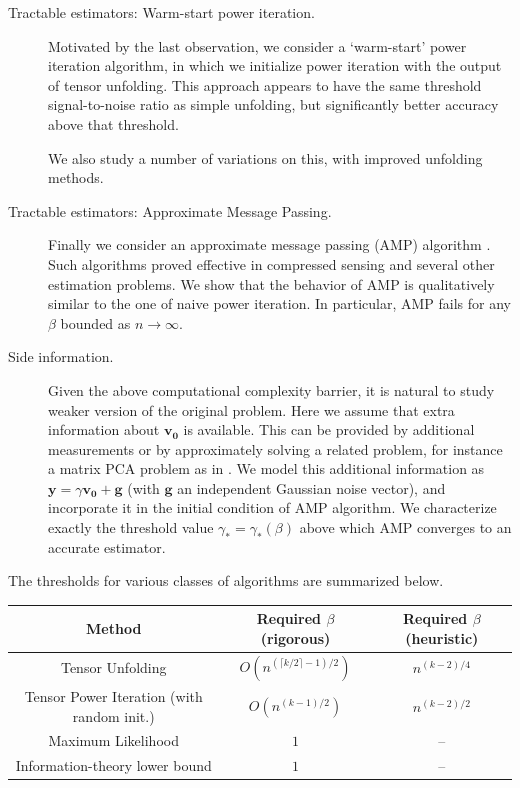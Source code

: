 \documentclass[11pt]{article}
\theoremstyle{definition}
\def\bg{\mathbf{g}}
\def\bvz{\mathbf{v_0}}
\def\by{{\mathbf y}}
\begin{document}
\begin{description}
\item[Tractable estimators: Warm-start power iteration.]
 Motivated by the last observation, we consider a `warm-start'
power iteration algorithm, in which we initialize power iteration with
the output of tensor unfolding. 
This  approach appears to have the same  threshold signal-to-noise
ratio as simple unfolding, but significantly better accuracy above
that threshold.

We also study a number of variations on this, with improved unfolding methods.

\item[Tractable estimators: Approximate Message Passing.] Finally we
consider an approximate message passing (AMP) algorithm \cite{DMM09,BM-MPCS-2011}. Such
algorithms proved effective in compressed sensing and several other
estimation problems. We show that the behavior of AMP is
qualitatively similar to the one of naive power iteration.
In particular,  AMP fails for any $\beta$ bounded as
$n\to\infty$.
%
\item[Side information.] Given the above computational complexity barrier, it is natural to
  study weaker version of the original problem. Here we assume that
  extra information about $\bvz$ is available. This can be provided by
  additional measurements or by approximately solving a related
  problem, for instance a matrix PCA problem as in
  \cite{anandkumar12}. We model this additional information as $\by =
  \gamma \bvz + \bg$ (with $\bg$ an independent Gaussian noise
  vector), and incorporate it
  in the initial condition of AMP algorithm. 
We characterize exactly  the
threshold value $\gamma_*=\gamma_*(\beta)$ above which AMP 
converges to an accurate estimator.
% 
\end{description}
%

The thresholds for various classes of algorithms are summarized below.

\vspace{0.25cm}

%
\begin{tabular}{|c|c|c|}
\hline
 Method & Required  $\beta$  (rigorous) & Required  $\beta$  (heuristic) \\ 
 \hline  
 Tensor Unfolding & $O(n^{(\lceil k/2\rceil-1)/2})$ & $n^{(k-2)/4}$\\
 Tensor Power Iteration (with random init.) &  $O(n^{(k-1)/2})$ &  $n^{(k-2)/2}$\\
 Maximum Likelihood & $1$ & --\\
 Information-theory lower bound & $1$ & --\\
 \hline
\end{tabular}
%
\end{document}
